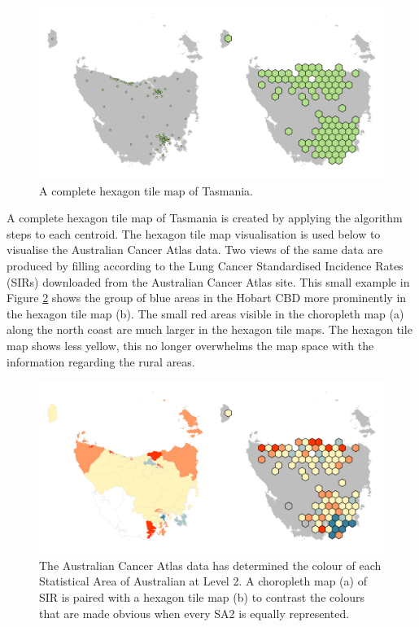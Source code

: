 \documentclass{monashthesis}
\begin{document}
\begin{figure}[H]
\centering
\includegraphics[width=14cm]{figures/03-algorithm/6allocate.png}
\caption{\label{fig:buffs}A complete hexagon tile map of Tasmania.}
\end{figure}

A complete hexagon tile map of Tasmania is created by applying the algorithm steps to each centroid.
The hexagon tile map visualisation is used below to visualise the Australian Cancer Atlas data. Two views of the same data are produced by filling according to the Lung Cancer Standardised Incidence Rates (SIRs) downloaded from the Australian Cancer Atlas site. This small example in Figure \ref{fig:sir} shows the group of blue areas in the Hobart CBD more prominently in the hexagon tile map (b).
The small red areas visible in the choropleth map (a) along the north coast are much larger in the hexagon tile maps. The hexagon tile map shows less yellow, this no longer overwhelms the map space with the information regarding the rural areas.

\begin{figure}[H]
\centering
\includegraphics[width=14cm]{figures/03-algorithm/7SIR.png}
\caption{\label{fig:sir}The Australian Cancer Atlas data has determined the colour of each Statistical Area of Australian at Level 2. A choropleth map (a) of SIR is paired with a hexagon tile map (b) to contrast the colours that are made obvious when every SA2 is equally represented.}
\end{figure}
\end{document}
